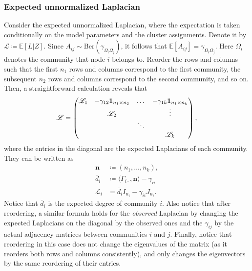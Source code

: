 \documentclass[../../main.tex]{subfiles} %
\begin{document}
\subsubsection{Expected unnormalized Laplacian} Consider the expected 
unnormalized 
Laplacian, where the expectation is taken conditionally on the model parameters 
and the cluster assignments. Denote it by \(\mathscr L \coloneqq \mathbb E [L 
\vert Z]\). Since \(A_{ij}  \sim \text{Ber}\left(\gamma_{\Omega_i 
\Omega_j}\right)\), it follows that \(\mathbb{E}\left[A_{ij}\right] = 
\gamma_{\Omega_i \Omega_j}\). Here \(\Omega_i\) denotes the community that node 
\(i\) belongs to. Reorder the rows and columns such that the first \(n_1\) rows 
and columns correspond to the first community, the subsequent \(n_2\) rows and 
columns correspond to the second community, and so on. Then, a straightforward 
calculation reveals that
\begin{dmath*} \label{eq:expected-unn-laplacian}
	\mathscr L =
	\begin{pmatrix}
		\mathscr L_1 & -\gamma_{12} \ones[n_1 \times n_2] & \dots & - 
		\gamma_{1k} \ones[n_1 \times n_k] \\
		 & \mathscr L_2 & & \vdots \\
		 & & \ddots & \\
		 & & & \mathscr L_k
		
	\end{pmatrix},
\end{dmath*}
where the entries in the diagonal are the expected Laplacians of each 
community. They can be written as
\begin{align*}
	\mathbf{n} &\coloneqq (n_1, \dots, n_k), \\
	\bar d_i &\coloneqq \langle \Gamma_{i \cdot}, \mathbf{n} \rangle - 
	\gamma_{ii}\\
	\mathscr L_i &= \bar d_i I_{n_i} - \gamma_{ii} J_{n_i}. 
\end{align*}
Notice that \(\bar d_i\) is the expected degree of community \(i\). Also notice 
that after reordering, a similar formula holds for the \textit{observed} 
Laplacian by changing the expected Laplacians on the diagonal by the observed 
ones and the \(\gamma_{ij}\) by the actual adjacency matrices between 
communities \(i\) and \(j\). Finally, notice that reordering in this case does 
not change the eigenvalues of the matrix (as it reorders both rows and columns 
consistently), and only changes the eigenvectors by the same reordering of 
their entries.
\end{document}
